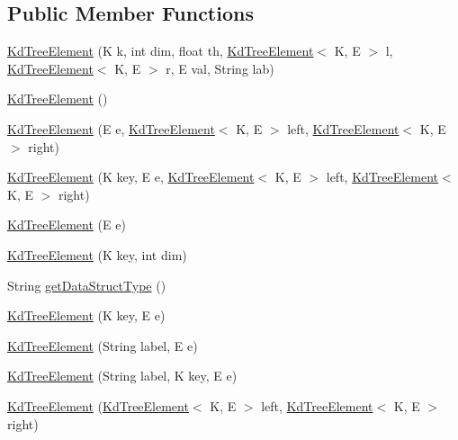 \subsection*{Public Member Functions}
\begin{DoxyCompactItemize}
\item 
\hyperlink{classbridges_1_1base_1_1_kd_tree_element_a6acdec52089792d20747c10f56139217}{Kd\+Tree\+Element} (K k, int dim, float th, \hyperlink{classbridges_1_1base_1_1_kd_tree_element}{Kd\+Tree\+Element}$<$ K, E $>$ l, \hyperlink{classbridges_1_1base_1_1_kd_tree_element}{Kd\+Tree\+Element}$<$ K, E $>$ r, E val, String lab)
\item 
\hyperlink{classbridges_1_1base_1_1_kd_tree_element_a11cb855f1a151714ee24901a9e91e0da}{Kd\+Tree\+Element} ()
\item 
\hyperlink{classbridges_1_1base_1_1_kd_tree_element_a1db51371824c570a937aa2a78a6cc744}{Kd\+Tree\+Element} (E e, \hyperlink{classbridges_1_1base_1_1_kd_tree_element}{Kd\+Tree\+Element}$<$ K, E $>$ left, \hyperlink{classbridges_1_1base_1_1_kd_tree_element}{Kd\+Tree\+Element}$<$ K, E $>$ right)
\item 
\hyperlink{classbridges_1_1base_1_1_kd_tree_element_a504060ecd4861b5b4de851b72f5bfffc}{Kd\+Tree\+Element} (K key, E e, \hyperlink{classbridges_1_1base_1_1_kd_tree_element}{Kd\+Tree\+Element}$<$ K, E $>$ left, \hyperlink{classbridges_1_1base_1_1_kd_tree_element}{Kd\+Tree\+Element}$<$ K, E $>$ right)
\item 
\hyperlink{classbridges_1_1base_1_1_kd_tree_element_a671342818955bc2c49b326251fde8a1b}{Kd\+Tree\+Element} (E e)
\item 
\hyperlink{classbridges_1_1base_1_1_kd_tree_element_a438fde369fff7d1c34e2007db0e07239}{Kd\+Tree\+Element} (K key, int dim)
\item 
String \hyperlink{classbridges_1_1base_1_1_kd_tree_element_a56b98bd1f3e1e5c0c37519c4b3cf5ba2}{get\+Data\+Struct\+Type} ()
\item 
\hyperlink{classbridges_1_1base_1_1_kd_tree_element_a0ee0c961255e89e18529a5c951db53d9}{Kd\+Tree\+Element} (K key, E e)
\item 
\hyperlink{classbridges_1_1base_1_1_kd_tree_element_a74c3ed00a266215c716ebc945b8d1a69}{Kd\+Tree\+Element} (String label, E e)
\item 
\hyperlink{classbridges_1_1base_1_1_kd_tree_element_ad2c3a73929648e6afce54536790d94c9}{Kd\+Tree\+Element} (String label, K key, E e)
\item 
\hyperlink{classbridges_1_1base_1_1_kd_tree_element_ad8cd8e37105af65a6ae06e743be9aebe}{Kd\+Tree\+Element} (\hyperlink{classbridges_1_1base_1_1_kd_tree_element}{Kd\+Tree\+Element}$<$ K, E $>$ left, \hyperlink{classbridges_1_1base_1_1_kd_tree_element}{Kd\+Tree\+Element}$<$ K, E $>$ right)

\end{DoxyCompactItemize}
